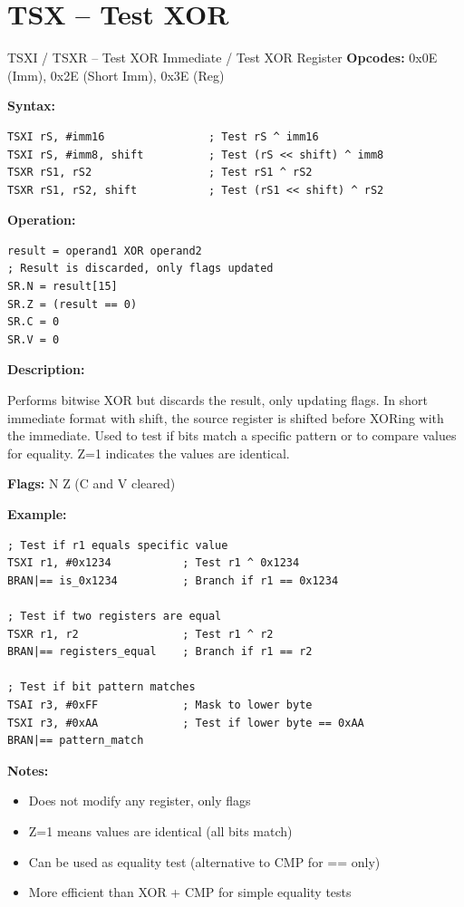 \section{TSX -- Test XOR}

\begin{instructionbox}{TSXI / TSXR -- Test XOR Immediate / Test XOR Register}
	\textbf{Opcodes:} 0x0E (Imm), 0x2E (Short Imm), 0x3E (Reg)

	\textbf{Syntax:}
	\begin{lstlisting}
TSXI rS, #imm16                ; Test rS ^ imm16
TSXI rS, #imm8, shift          ; Test (rS << shift) ^ imm8
TSXR rS1, rS2                  ; Test rS1 ^ rS2
TSXR rS1, rS2, shift           ; Test (rS1 << shift) ^ rS2
\end{lstlisting}

	\textbf{Operation:}
	\begin{verbatim}
result = operand1 XOR operand2
; Result is discarded, only flags updated
SR.N = result[15]
SR.Z = (result == 0)
SR.C = 0
SR.V = 0
\end{verbatim}

	\textbf{Description:}

	Performs bitwise XOR but discards the result, only updating flags. In short immediate format with shift, the source
	register is shifted before XORing with the immediate. Used to test if bits match a specific pattern or to compare
	values for equality. Z=1 indicates the values are identical.

	\textbf{Flags:} N Z (C and V cleared)

	\textbf{Example:}
	\begin{lstlisting}
; Test if r1 equals specific value
TSXI r1, #0x1234           ; Test r1 ^ 0x1234
BRAN|== is_0x1234          ; Branch if r1 == 0x1234

; Test if two registers are equal
TSXR r1, r2                ; Test r1 ^ r2
BRAN|== registers_equal    ; Branch if r1 == r2

; Test if bit pattern matches
TSAI r3, #0xFF             ; Mask to lower byte
TSXI r3, #0xAA             ; Test if lower byte == 0xAA
BRAN|== pattern_match
\end{lstlisting}

	\textbf{Notes:}
	\begin{itemize}
		\item Does not modify any register, only flags
		\item Z=1 means values are identical (all bits match)
		\item Can be used as equality test (alternative to CMP for == only)
		\item More efficient than XOR + CMP for simple equality tests
	\end{itemize}
\end{instructionbox}

